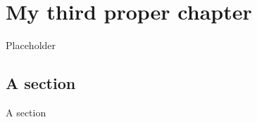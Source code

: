 \chapter[My third proper chapter]{My third proper chapter}
Placeholder
\section{A section}
A section
